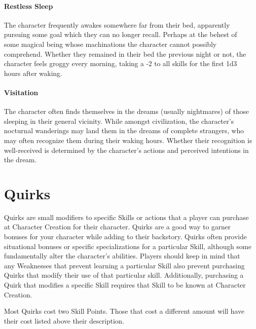 \documentclass[oneside]{book}
\begin{document}
\begin{multicols}{2}
\subsubsection{Restless Sleep}
The character frequently awakes somewhere far from their bed, apparently pursuing some goal which they can no longer recall. Perhaps at the behest of some magical being whose machinations the character cannot possibly comprehend. Whether they remained in their bed the previous night or not, the character feels groggy every morning, taking a -2 to all skills for the first 1d3 hours after waking.  

\subsubsection{Visitation}
The character often finds themselves in the dreams (usually nightmares) of those sleeping in their general vicinity. While amongst civilization, the character's nocturnal wanderings may land them in the dreams of complete strangers, who may often recognize them during their waking hours. Whether their recognition is well-received is determined by the character's actions and perceived intentions in the dream.  
\end{multicols}

\chapter{Quirks}
Quirks are small modifiers to specific Skills or actions that a player can purchase at Character Creation for their character. Quirks are a good way to garner bonuses for your character while adding to their backstory. Quirks often provide situational bonuses or specific specializations for a particular Skill, although some fundamentally alter the character's abilities. Players should keep in mind that any Weaknesses that prevent learning a particular Skill also prevent purchasing Quirks that modify their use of that particular skill. Additionally, purchasing a Quirk that modifies a specific Skill requires that Skill to be known at Character Creation.  

Most Quirks cost two Skill Points. Those that cost a different amount will have their cost listed above their description. 
\end{document}
